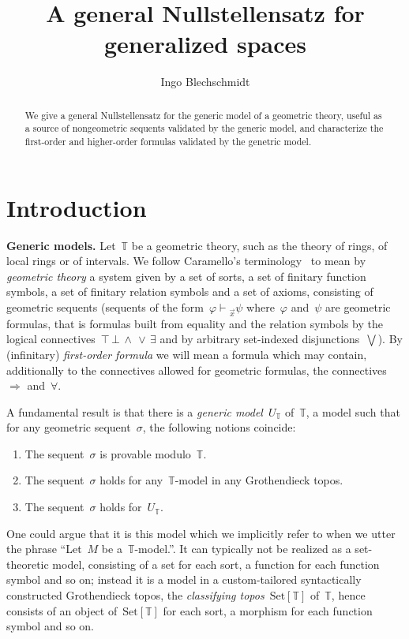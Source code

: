 \documentclass[oneside,reqno]{amsart}
\title{A general Nullstellensatz for generalized spaces}
\author{Ingo Blechschmidt}
\theoremstyle{definition}
\theoremstyle{plain}
\theoremstyle{remark}
\newcommand{\TT}{\mathbb{T}}
\newcommand{\Set}{\mathrm{Set}}
\renewcommand{\_}{\mathpunct{.}\,}
\newcommand{\?}{\,{:}\,}
\renewcommand{\paragraph}[1]{\noindent\textbf{#1.}}
\newcommand{\seq}[1]{\mathrel{\vdash\!\!\!_{#1}}}
\begin{document}
\begin{abstract}
  We give a general Nullstellensatz for the generic model of a
  geometric theory, useful as a source of nongeometric sequents validated by
  the generic model, and characterize the first-order and higher-order formulas validated by the
  genetric model.
\end{abstract}

\maketitle
\thispagestyle{empty}

\section{Introduction}

\paragraph{Generic models} Let~$\TT$ be a geometric theory, such as the theory
of rings, of local rings or of intervals. We follow Caramello's
terminology~\cite{caramello:tst} to mean by \emph{geometric theory} a system
given by a set of sorts, a set of finitary function symbols, a set of finitary
relation symbols and a set of axioms, consisting of geometric sequents
(sequents of the form~$\varphi \seq{\vec x} \psi$ where~$\varphi$ and~$\psi$
are geometric formulas, that is formulas built from equality and the relation
symbols by the logical connectives~${\top}\,{\bot}\,{\wedge}\,{\vee}\,{\exists}$
and by arbitrary set-indexed disjunctions~$\bigvee$). By (infinitary) \emph{first-order
formula} we will mean a formula which may contain, additionally to the
connectives allowed for geometric formulas, the connectives~${\Rightarrow}$
and~${\forall}$.

A fundamental result is that there is a \emph{generic model}~$U_\TT$ of~$\TT$,
a model such that for any geometric sequent~$\sigma$, the following notions
coincide:
\begin{enumerate}
\item The sequent~$\sigma$ is provable modulo~$\TT$.
\item The sequent~$\sigma$ holds for any~$\TT$-model in any Grothendieck topos.
\item The sequent~$\sigma$ holds for~$U_\TT$.
\end{enumerate}
One could argue that it is this model which we
implicitly refer to when we utter the phrase ``Let~$M$ be a~$\TT$-model.''. It can
typically not be realized as a set-theoretic model, consisting of a set for
each sort, a function for each function symbol and so on; instead it is a model
in a custom-tailored syntactically constructed Grothendieck topos, the
\emph{classifying topos}~$\Set[\TT]$ of~$\TT$, hence consists of an object
of~$\Set[\TT]$ for each sort, a morphism for each function symbol and so on.
\end{document}
